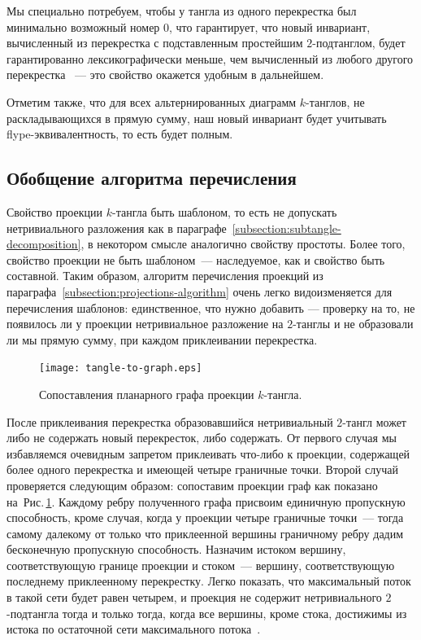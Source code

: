 \documentclass[12pt]{article}
\theoremstyle{plain}
\theoremstyle{definition}
\def\figureref#1{Рис.\,\protect\ref{#1}}
\begin{document}
		Мы специально потребуем, чтобы у тангла из одного перекрестка был минимально возможный номер 0, что гарантирует, что новый
		инвариант, вычисленный из перекрестка с подставленным простейшим $2$-подтанглом, будет гарантированно лексикографически меньше,
		чем вычисленный из любого другого перекрестка ~--- это свойство окажется удобным в дальнейшем.

		Отметим также, что для всех альтернированных диаграмм $k$-танглов, не раскладывающихся в прямую сумму, наш новый инвариант
		будет учитывать flype-эквивалентность, то есть будет полным.

	\subsection{Обобщение алгоритма перечисления}

		Свойство проекции $k$-тангла быть шаблоном, то есть не допускать нетривиального разложения как в
		параграфе~\ref{subsection:subtangle-decomposition}, в некотором смысле аналогично свойству простоты. Более того, свойство
		проекции не быть шаблоном~--- наследуемое, как и свойство быть составной. Таким образом, алгоритм перечисления проекций из
		параграфа~\ref{subsection:projections-algorithm} очень легко видоизменяется для перечисления шаблонов: единственное, что нужно
		добавить --- проверку на то, не появилось ли у проекции нетривиальное разложение на $2$-танглы и не образовали ли мы прямую сумму,
		при каждом приклеивании перекрестка.

		\begin{figure}[ht]
			\centering
			\texttt{[image: tangle-to-graph.eps]}
			\caption{\footnotesize Сопоставления планарного графа проекции $k$-тангла.\label{figure:tangle-to-graph}}
		\end{figure}

		После приклеивания перекрестка образовавшийся нетривиальный $2$-тангл может либо не содержать новый перекресток, либо содержать.
		От первого случая мы избавляемся очевидным запретом приклеивать что-либо к проекции, содержащей более одного перекрестка и
		имеющей четыре граничные точки. Второй случай проверяется следующим образом: сопоставим проекции граф как показано
		на~\figureref{figure:tangle-to-graph}. Каждому ребру полученного графа присвоим единичную пропускную способность, кроме случая,
		когда у проекции четыре граничные точки~--- тогда самому далекому от только что приклеенной вершины граничному ребру дадим
		бесконечную пропускную способность. Назначим истоком вершину, соответствующую границе проекции и стоком~--- вершину, соответствующую
		последнему приклеенному перекрестку. Легко показать, что максимальный поток в такой сети будет равен четырем, и проекция не содержит
		нетривиального $2$-подтангла тогда и только тогда, когда все вершины, кроме стока, достижимы из истока по остаточной сети
		максимального потока~\cite{CormenLeisersonRivestStein2009, Sedgewick1983}.
\end{document}
